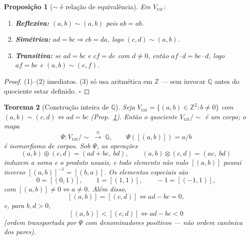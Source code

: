 \documentclass[11pt,a4paper]{article}
\newtheorem{teorema}{Teorema}
\newtheorem{proposicao}[teorema]{Proposição}
\begin{document}
\begin{proposicao}[$\sim$ é relação de equivalência]\label{prop:equiv}
Em $V_{\mathrm{rat}}$:
\begin{enumerate}\itemsep2pt
\item \textbf{Reflexiva:} $(a,b)\sim(a,b)$ pois $ab=ab$.
\item \textbf{Simétrica:} $ad=bc\Rightarrow cb=da$, logo $(c,d)\sim(a,b)$.
\item \textbf{Transitiva:} se $ad=bc$ e $cf=de$ com $d\neq 0$, então
      $af\cdot d=be\cdot d$, logo $af=be$ e $(a,b)\sim(e,f)$.
\end{enumerate}
\end{proposicao}

\begin{proof}
(1)--(2) imediatos. (3) só usa aritmética em $\mathbb{Z}$ --- sem invocar
$\mathbb{Q}$ antes do quociente estar definido. $\square$
\end{proof}

\begin{teorema}[Construção inteira de $\mathbb{Q}$]\label{thm:q}
Seja $V_{\mathrm{rat}}=\{(a,b)\in\mathbb{Z}^{2}:b\neq0\}$ com
$(a,b)\sim(c,d)\iff ad=bc$ (Prop.~\ref{prop:equiv}). Então o quociente
$V_{\mathrm{rat}}/{\sim}$ é um corpo; o mapa
\[
\boxed{\;
\Psi\colon V_{\mathrm{rat}}/{\sim}\;\overset{\cong}{\longrightarrow}\;\mathbb{Q},\qquad
\Psi([(a,b)])=a/b\;}
\]
é isomorfismo de corpos. Sob $\Psi$, as operações
\[
(a,b)\oplus(c,d)=(ad+bc,\;bd),\qquad
(a,b)\otimes(c,d)=(ac,\;bd)
\]
induzem a soma e o produto usuais, e todo elemento não nulo $[(a,b)]$ possui
inverso $[(a,b)]^{-1}=[(b,a)]$. Os elementos especiais são
\[
0=[(0,1)],\qquad 1=[(1,1)],\qquad -1=[(-1,1)],
\]
com $[(a,b)]\neq 0\iff a\neq 0$. Além disso,
\[
[(a,b)]=[(c,d)]\iff ad-bc=0,
\]
e, para $b,d>0$,
\[
[(a,b)]<[(c,d)]\iff ad-bc<0
\]
(\emph{ordem transportada} por $\Psi$ com denominadores positivos --- não ordem
canônica dos pares).
\end{teorema}
\end{document}
